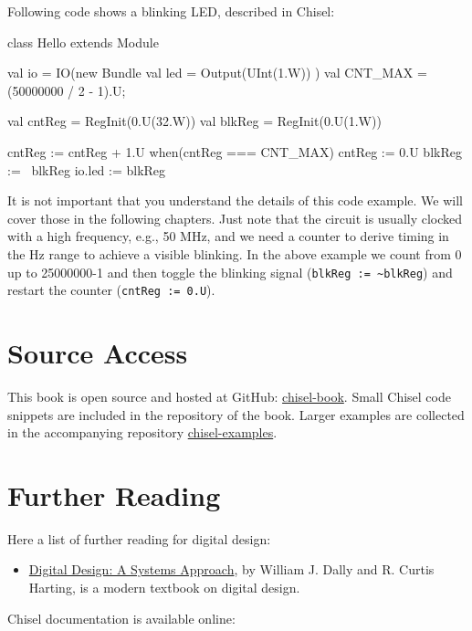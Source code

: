 \documentclass[%
    11pt, %
    headinclude, footexclude,
    openright, %
    notitlepage,
    cleardoubleempty,
    headsepline,
    pointlessnumbers,
    bibtotoc, idxtotoc,
    ]{scrbook}
\newcommand{\code}[1]{{\small{\texttt{#1}}}}
\begin{document}
Following code shows a blinking LED, described in Chisel:

\begin{chisel}
class Hello extends Module {
  val io = IO(new Bundle {
    val led = Output(UInt(1.W))
  })
  val CNT_MAX = (50000000 / 2 - 1).U;
  
  val cntReg = RegInit(0.U(32.W))
  val blkReg = RegInit(0.U(1.W))

  cntReg := cntReg + 1.U
  when(cntReg === CNT_MAX) {
    cntReg := 0.U
    blkReg := ~blkReg
  }
  io.led := blkReg
}
\end{chisel}

It is not important that you understand the details of this code example.
We will cover those in the following chapters. Just note that the circuit is
usually clocked with a high frequency, e.g., 50 MHz, and we need a counter
to derive timing in the Hz range to achieve a visible blinking. In the above
example we count from 0 up to 25000000-1 and then toggle the blinking signal
(\code{blkReg := \textasciitilde blkReg}) and restart the counter (\code{cntReg := 0.U}).

\section{Source Access}

This book is open source and hosted at GitHub: \href{https://github.com/schoeberl/chisel-book}{chisel-book}.
Small Chisel code snippets are included in the repository of the book.
Larger examples are collected in the accompanying repository \href{https://github.com/schoeberl/chisel-examples}{chisel-examples}.

\section{Further Reading}

Here a list of further reading for digital design:
\begin{itemize}
\item \href{http://www.cambridge.org/es/academic/subjects/engineering/circuits-and-systems/digital-design-systems-approach}{Digital Design: A Systems Approach}, by William J. Dally and R. Curtis Harting,
is a modern textbook on digital design.
\end{itemize}

Chisel documentation is available online:
\end{document}
